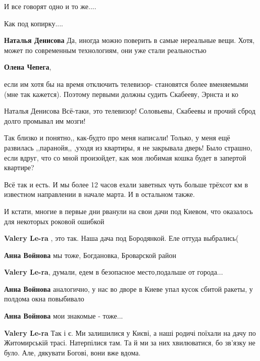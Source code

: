 \begin{itemize}
\begin{itemize}
И все говорят одно и то же....

Как под копирку....

\textbf{Наталья Денисова} Да, иногда можно поверить в самые нереальные вещи. Хотя, может по современным технологиям, они уже стали реальностью

\textbf{Олена Чепега}, 

если им хотя бы на время отключить телевизор- становятся более вменяемыми (мне
так кажется). Поэтому первыми должны судить Скабееву, Эрнста и ко

Наталья Денисова Всё-таки, это телевизор! Соловьевы, Скабеевы и прочий сброд долго промывал им мозги!


Так близко и понятно,, как-будто про меня написали! Только, у меня ещё
развилась ,,паранойя,, ,уходя из квартиры, я не закрывала дверь! Было
страшно, если вдруг, что со мной произойдет, как моя любимая кошка будет в
запертой квартире?

\end{itemize} %


Всё так и есть. И мы более 12 часов ехали заветных чуть больше трёхсот км в
известном направлении в начале марта. И в остальном также.


И кстати, многие в первые дни рванули на свои дачи под Киевом, что оказалось
для некоторых роковой ошибкой

\begin{itemize} %
\textbf{Valery Le-ra} , это так. Наша дача под Бородянкой. Еле оттуда выбрались(

\textbf{Анна Войнова} мы тоже, Богдановка, Броварской район

\textbf{Valery Le-ra}, думали, едем в безопасное место,подальше от города...

\textbf{Анна Войнова} аналогично, у нас во дворе в Киеве упал кусок сбитой ракеты, у полдома окна повыбивало

\textbf{Анна Войнова} мои знакомые - тоже...

\textbf{Valery Le-ra} Так і є. Ми залишилися у Києві, а наші родичі поїхали на дачу по Житомирській трасі. Натерпілися там. Та й ми за них хвилюватися, бо зв'язку не було. Але, дякувати Богові, вони вже вдома.


\end{itemize}
\end{itemize}
